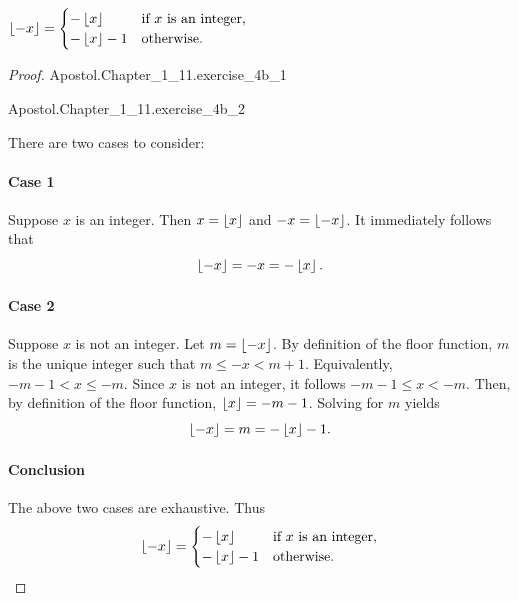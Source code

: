 \documentclass{report}
\begin{document}
\subsubsection{}%
\label{ssub:exercise-1.11.4b}

$\left\lfloor-x\right\rfloor =
  \begin{cases}
    -\left\lfloor x\right\rfloor & \text{if } x \text{ is an integer}, \\
    -\left\lfloor x\right\rfloor - 1 & \text{otherwise}.
  \end{cases}$

\begin{proof}

  \statementpadding

    {Apostol.Chapter\_1\_11.exercise\_4b\_1}

    {Apostol.Chapter\_1\_11.exercise\_4b\_2}

  There are two cases to consider:

  \paragraph{Case 1}%

    Suppose $x$ is an integer.
    Then $x = \left\lfloor x\right\rfloor$ and $-x = \left\lfloor-x\right\rfloor$.
    It immediately follows that $$\left\lfloor-x\right\rfloor = -x = -\left\lfloor x\right\rfloor.$$

  \paragraph{Case 2}%

    Suppose $x$ is not an integer.
    Let $m = \left\lfloor-x\right\rfloor$.
    By definition of the floor function, $m$ is the unique integer such that
      $m \leq -x < m + 1$.
    Equivalently, $-m - 1 < x \leq -m$.
    Since $x$ is not an integer, it follows $-m - 1 \leq x < -m$.
    Then, by definition of the floor function, $\left\lfloor x\right\rfloor = -m - 1$.
    Solving for $m$ yields $$\left\lfloor-x\right\rfloor = m = -\left\lfloor x\right\rfloor - 1.$$

  \paragraph{Conclusion}%

    The above two cases are exhaustive. Thus
      $$\left\lfloor-x\right\rfloor =
        \begin{cases}
          -\left\lfloor x\right\rfloor & \text{if } x \text{ is an integer}, \\
          -\left\lfloor x\right\rfloor - 1 & \text{otherwise}.
        \end{cases}$$

\end{proof}
\end{document}
